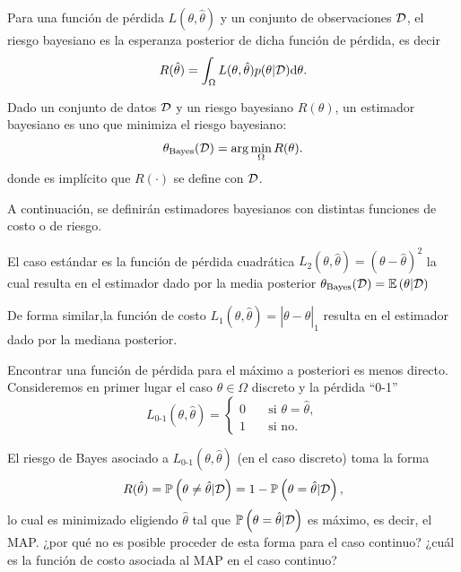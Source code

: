 \begin{definition}
Para una función de pérdida $L(\theta,\hat\theta)$ y un conjunto de observaciones ${\mathcal D}$, el riesgo bayesiano es la esperanza posterior de dicha función de pérdida, es decir
\begin{equation}
    R(\hat\theta) = \int_\Omega L(\theta,\hat\theta)p(\theta|{\mathcal D}){\text{d}}\theta.
\end{equation}
\end{definition}



\begin{definition}
Dado un conjunto de datos ${\mathcal D}$ y un riesgo bayesiano $R(\theta)$, un estimador bayesiano es uno que minimiza el riesgo bayesiano:
\begin{equation}
    \theta_\text{Bayes}({\mathcal D}) = \arg\min_{\Omega} R(\theta).
\end{equation}
donde es implícito que $R(\cdot)$ se define con ${\mathcal D}$.
\end{definition}

A continuación, se definirán estimadores bayesianos  con distintas funciones de costo o de riesgo.


\begin{definition}
El  caso estándar es la función de pérdida cuadrática $L_2(\theta,\hat\theta) = (\theta-\hat\theta)^2$ la cual resulta en el estimador dado por la media posterior $\theta_\text{Bayes}({\mathcal D}) = \mathbb{E} \left(\theta|{\mathcal D}\right)$
\end{definition}


\begin{definition}

De forma similar,la función de costo $L_1(\theta,\hat\theta) = |\theta-\hat\theta|_1$ resulta en el estimador dado por la mediana posterior.
\end{definition}

Encontrar una función de pérdida para el máximo a posteriori es menos directo. Consideremos en primer lugar el caso $\theta\in\Omega$ discreto y la pérdida ``0-1''
\[   
L_\text{0-1}(\theta,\hat\theta) = 
     \begin{cases}
       0 &\quad\text{si } \theta = \hat\theta,\\
       1 &\quad\text{si no}. 
     \end{cases}
\]

El riesgo de Bayes asociado a $L_\text{0-1}(\theta,\hat\theta)$ (en el caso discreto) toma la forma
\begin{equation}
    R(\hat\theta) = \mathbb{P} \left(\theta\neq\hat\theta|{\mathcal D}\right) = 1-\mathbb{P} \left(\theta = \hat\theta|{\mathcal D}\right),
\end{equation}
lo cual es minimizado eligiendo $\hat\theta$ tal que $\mathbb{P} \left(\theta = \hat\theta|{\mathcal D}\right)$ es máximo, es decir, el MAP. ¿por qué no es posible proceder de esta forma para el caso continuo? ¿cuál es la función de costo asociada al MAP en el caso continuo?

